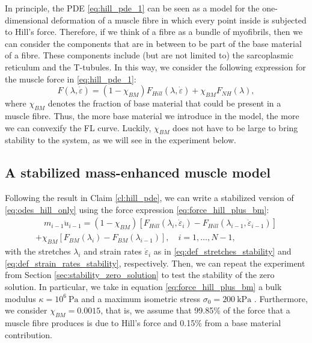 \documentclass{sfuthesis}
\numberwithin{equation}{section}
\numberwithin{figure}{chapter}
\numberwithin{table}{chapter}
\theoremstyle{definition}
\newcommand{\depsilon}{\dot{\varepsilon}}
\begin{document}
In principle, the PDE \eqref{eq:hill_pde_1} can be seen as a model for the one-dimensional deformation of a muscle fibre in which every point inside is subjected to Hill's force. Therefore, if we think of a fibre as a bundle of myofibrils, then we can consider the components that are in between to be part of the base material of a fibre. These components include (but are not limited to) the sarcoplasmic reticulum and the T-tubules. In this way, we consider the following expression for the muscle force in \eqref{eq:hill_pde_1}:
\begin{equation} \label{eq:force_hill_plus_bm}
    F(\lambda, \depsilon) = (1-\chi_{BM}) F_{Hill}(\lambda, \depsilon) + \chi_{BM} F_{NH}(\lambda),
\end{equation}
where $\chi_{BM}$ denotes the fraction of base material that could be present in a muscle fibre. Thus, the more base material we introduce in the model, the more we can convexify the FL curve. Luckily, $\chi_{BM}$ does not have to be large to bring stability to the system, as we will see in the experiment below.

\subsection{A stabilized mass-enhanced muscle model}

Following the result in Claim \ref{cl:hill_pde}, we can write a stabilized version of \eqref{eq:odes_hill_only} using the force expression \eqref{eq:force_hill_plus_bm}:
\begin{multline} \label{eq:odes_hill_stabilized}
    \quad m_{i-1} \ddot{u}_{i-1} =
    (1-\chi_{BM})\left[ F_{Hill}(\lambda_i, \depsilon_i) - F_{Hill}(\lambda_{i-1}, \depsilon_{i-1}) \right] \\ 
    + \chi_{BM}\left[ F_{BM}(\lambda_i) - F_{BM}(\lambda_{i-1}) \right], \quad i = 1,\dots,N-1, \quad 
\end{multline}
with the stretches $\lambda_i$ and strain rates $\depsilon_i$ as in \eqref{eq:def_stretches_stability} and \eqref{eq:def_strain_rates_stability}, respectively. Then, we can repeat the experiment from Section \ref{sec:stability_zero_solution} to test the stability of the zero solution. In particular, we take in equation \eqref{eq:force_hill_plus_bm} a bulk modulus $\kappa = 10^6 \ \text{Pa}$ and a maximum isometric stress $\sigma_0 = 200 \ \text{kPa}$ \cite{AlmonacidEtAl2022_SIAP_Paper}. Furthermore, we consider $\chi_{BM} = 0.0015$, that is, we assume that 99.85\% of the force that a muscle fibre produces is due to Hill's force and 0.15\% from a base material contribution. 
\end{document}
